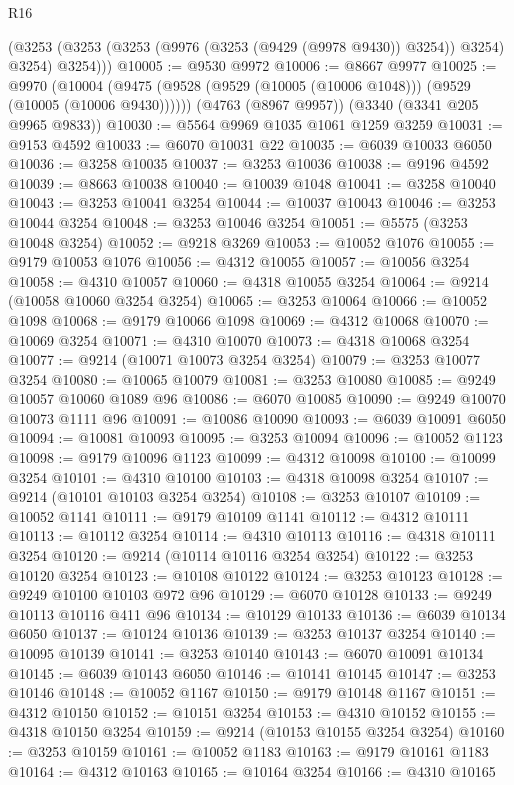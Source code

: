 \begin{lexlean}{R16}
\begin{coremodule}
        (@3253 (@3253 (@3253 (@9976 (@3253 (@9429 (@9978 @9430)) @3254)) @3254) @3254) @3254)))
@10005 := @9530 @9972
@10006 := @8667 @9977
@10025 := @9970
    (@10004 (@9475 (@9528 (@9529 (@10005 (@10006 @1048))) (@9529 (@10005 (@10006 @9430))))))
    (@4763 (@8967 @9957))
    (@3340 (@3341 @205 @9965 @9833))
@10030 := @5564 @9969 @1035 @1061 @1259 @3259
@10031 := @9153 @4592
@10033 := @6070 @10031 @22
@10035 := @6039 @10033 @6050
@10036 := @3258 @10035
@10037 := @3253 @10036
@10038 := @9196 @4592
@10039 := @8663 @10038
@10040 := @10039 @1048
@10041 := @3258 @10040
@10043 := @3253 @10041 @3254
@10044 := @10037 @10043
@10046 := @3253 @10044 @3254
@10048 := @3253 @10046 @3254
@10051 := @5575 (@3253 @10048 @3254)
@10052 := @9218 @3269
@10053 := @10052 @1076
@10055 := @9179 @10053 @1076
@10056 := @4312 @10055
@10057 := @10056 @3254
@10058 := @4310 @10057
@10060 := @4318 @10055 @3254
@10064 := @9214 (@10058 @10060 @3254 @3254)
@10065 := @3253 @10064
@10066 := @10052 @1098
@10068 := @9179 @10066 @1098
@10069 := @4312 @10068
@10070 := @10069 @3254
@10071 := @4310 @10070
@10073 := @4318 @10068 @3254
@10077 := @9214 (@10071 @10073 @3254 @3254)
@10079 := @3253 @10077 @3254
@10080 := @10065 @10079
@10081 := @3253 @10080
@10085 := @9249 @10057 @10060 @1089 @96
@10086 := @6070 @10085
@10090 := @9249 @10070 @10073 @1111 @96
@10091 := @10086 @10090
@10093 := @6039 @10091 @6050
@10094 := @10081 @10093
@10095 := @3253 @10094
@10096 := @10052 @1123
@10098 := @9179 @10096 @1123
@10099 := @4312 @10098
@10100 := @10099 @3254
@10101 := @4310 @10100
@10103 := @4318 @10098 @3254
@10107 := @9214 (@10101 @10103 @3254 @3254)
@10108 := @3253 @10107
@10109 := @10052 @1141
@10111 := @9179 @10109 @1141
@10112 := @4312 @10111
@10113 := @10112 @3254
@10114 := @4310 @10113
@10116 := @4318 @10111 @3254
@10120 := @9214 (@10114 @10116 @3254 @3254)
@10122 := @3253 @10120 @3254
@10123 := @10108 @10122
@10124 := @3253 @10123
@10128 := @9249 @10100 @10103 @972 @96
@10129 := @6070 @10128
@10133 := @9249 @10113 @10116 @411 @96
@10134 := @10129 @10133
@10136 := @6039 @10134 @6050
@10137 := @10124 @10136
@10139 := @3253 @10137 @3254
@10140 := @10095 @10139
@10141 := @3253 @10140
@10143 := @6070 @10091 @10134
@10145 := @6039 @10143 @6050
@10146 := @10141 @10145
@10147 := @3253 @10146
@10148 := @10052 @1167
@10150 := @9179 @10148 @1167
@10151 := @4312 @10150
@10152 := @10151 @3254
@10153 := @4310 @10152
@10155 := @4318 @10150 @3254
@10159 := @9214 (@10153 @10155 @3254 @3254)
@10160 := @3253 @10159
@10161 := @10052 @1183
@10163 := @9179 @10161 @1183
@10164 := @4312 @10163
@10165 := @10164 @3254
@10166 := @4310 @10165

\end{coremodule}
\end{lexlean}
